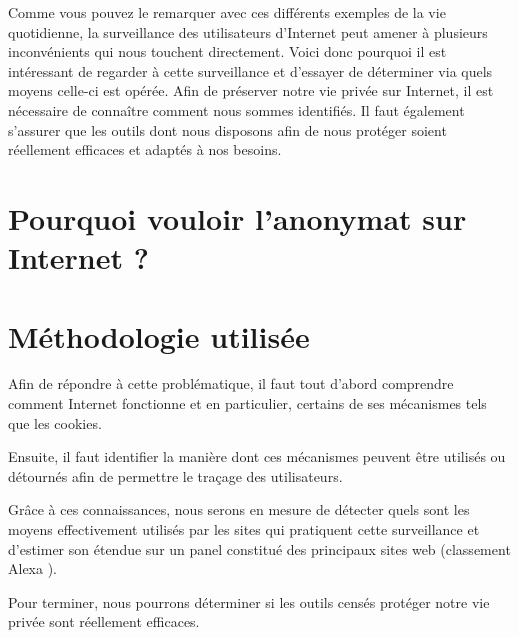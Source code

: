 Comme vous pouvez le remarquer avec ces différents exemples de la vie quotidienne, la surveillance des utilisateurs d'Internet peut amener à plusieurs inconvénients qui nous touchent directement. Voici donc pourquoi il est intéressant de regarder à cette surveillance et d'essayer de déterminer via quels moyens celle-ci est opérée. Afin de préserver notre vie privée sur Internet, il est nécessaire de connaître comment nous sommes identifiés. Il faut également s'assurer que les outils dont nous disposons afin de nous protéger soient réellement efficaces et adaptés à nos besoins.

\section{Pourquoi vouloir l'anonymat sur Internet ?}

\section{Méthodologie utilisée}
Afin de répondre à cette problématique, il faut tout d'abord comprendre comment Internet fonctionne et en particulier, certains de ses mécanismes tels que les cookies.

Ensuite, il faut identifier la manière dont ces mécanismes peuvent être utilisés ou détournés afin de permettre le traçage des utilisateurs.

Grâce à ces connaissances, nous serons en mesure de détecter quels sont les moyens effectivement utilisés par les sites qui pratiquent cette surveillance et d'estimer son étendue sur un panel constitué des principaux sites web (classement Alexa \cite{AlexaTop}).

Pour terminer, nous pourrons déterminer si les outils censés protéger notre vie privée sont réellement efficaces. %
